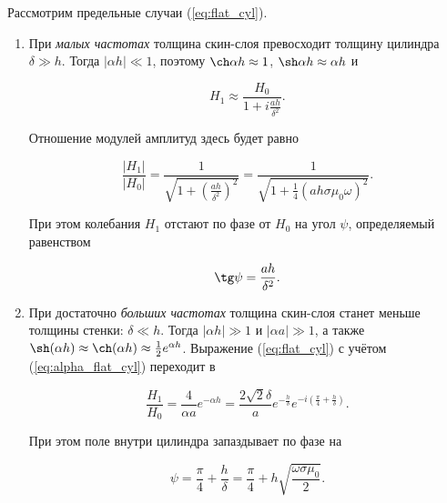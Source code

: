 \documentclass[a4paper, 12pt]{article}
\begin{document}
    Рассмотрим предельные случаи (\ref{eq:flat_cyl}).

    \begin{enumerate}
        \item При \textit{малых частотах} толщина скин-слоя превосходит толщину цилиндра $\delta \gg h$. Тогда $\lvert \alpha h \rvert \ll 1$, поэтому $\ch \alpha h \approx 1$, $\sh \alpha h \approx \alpha h$ и

        \begin{equation}
            H_1 \approx \frac{H_0}{1 + i \frac{ah}{\delta^2}}.
            \label{eq:nu_ll_1}
        \end{equation}

        Отношение модулей амплитуд здесь будет равно 

        \begin{equation}
            \frac{\lvert H_1 \rvert}{\lvert H_0 \rvert} = \frac{1}{\sqrt{1 + \left(\frac{ah}{\delta^2}\right)^2}} = \frac{1}{\sqrt{1 + \frac{1}{4} \left( ah\sigma\mu_0 \omega \right)^2}}.
            \label{eq:nu_ll_2}
        \end{equation}

        При этом колебания $H_1$ отстают по фазе от $H_0$ на угол $\psi$, определяемый равенством 

        \begin{equation}
            \tg \psi = \frac{ah}{\delta^2}.
            \label{eq:tg_psi}
        \end{equation}

        \item При достаточно \textit{больших частотах} толщина скин-слоя станет меньше толщины стенки: $\delta \ll h$. Тогда $\lvert \alpha h \rvert \gg 1$ и $\lvert \alpha a \rvert \gg 1$, а также $\sh (\alpha h) \approx \ch (\alpha h) \approx \frac{1}{2} e^{\alpha h}$. Выражение (\ref{eq:flat_cyl}) с учётом (\ref{eq:alpha_flat_cyl}) переходит в

        \begin{equation}
            \frac{H_1}{H_0} = \frac{4}{\alpha a} e^{-\alpha h} = \frac{2 \sqrt{2} \delta}{a} e^{-\frac{h}{\delta}} e^{-i\left( \frac{\pi}{4} + \frac{h}{\delta} \right)}.
        \end{equation}

        При этом поле внутри цилиндра запаздывает по фазе на 

        \begin{equation}
            \psi = \frac{\pi}{4} + \frac{h}{\delta} = \frac{\pi}{4} + h\sqrt{\frac{\omega \sigma \mu_0}{2}}.
            \label{eq:psi}
        \end{equation}
        
    \end{enumerate}
\end{document}
